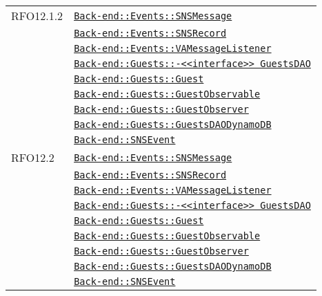 \begin{longtable}{|>{\centering}m{3cm}|m{10cm}<{\centering}|}
RFO12.1.2 & \hyperref[Back-end::Events::SNSMessage]{\texttt{Back-end::Events::SNSMessage}}\\
& \hyperref[Back-end::Events::SNSRecord]{\texttt{Back-end::Events::SNSRecord}}\\
& \hyperref[Back-end::Events::VAMessageListener]{\texttt{Back-end::Events::VAMessageListener}}\\
& \hyperref[Back-end::Guests::<<interface>> GuestsDAO]{\texttt{Back-end::Guests::-\linebreak <<interface>> GuestsDAO}}\\
& \hyperref[Back-end::Guests::Guest]{\texttt{Back-end::Guests::Guest}}\\
& \hyperref[Back-end::Guests::GuestObservable]{\texttt{Back-end::Guests::GuestObservable}}\\
& \hyperref[Back-end::Guests::GuestObserver]{\texttt{Back-end::Guests::GuestObserver}}\\
& \hyperref[Back-end::Guests::GuestsDAODynamoDB]{\texttt{Back-end::Guests::GuestsDAODynamoDB}}\\
& \hyperref[Back-end::SNSEvent]{\texttt{Back-end::SNSEvent}}\\ \hline

RFO12.2 & \hyperref[Back-end::Events::SNSMessage]{\texttt{Back-end::Events::SNSMessage}}\\
& \hyperref[Back-end::Events::SNSRecord]{\texttt{Back-end::Events::SNSRecord}}\\
& \hyperref[Back-end::Events::VAMessageListener]{\texttt{Back-end::Events::VAMessageListener}}\\
& \hyperref[Back-end::Guests::<<interface>> GuestsDAO]{\texttt{Back-end::Guests::-\linebreak <<interface>> GuestsDAO}}\\
& \hyperref[Back-end::Guests::Guest]{\texttt{Back-end::Guests::Guest}}\\
& \hyperref[Back-end::Guests::GuestObservable]{\texttt{Back-end::Guests::GuestObservable}}\\
& \hyperref[Back-end::Guests::GuestObserver]{\texttt{Back-end::Guests::GuestObserver}}\\
& \hyperref[Back-end::Guests::GuestsDAODynamoDB]{\texttt{Back-end::Guests::GuestsDAODynamoDB}}\\
& \hyperref[Back-end::SNSEvent]{\texttt{Back-end::SNSEvent}}\\ \hline


\end{longtable}
